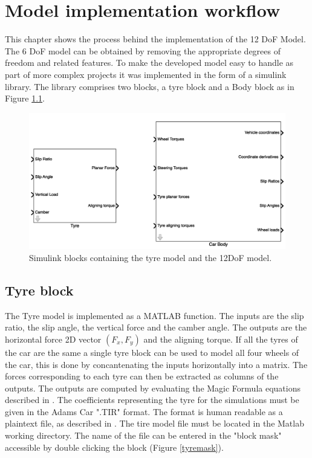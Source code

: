 \chapter{Model implementation workflow}
\label{chap:workflow}
This chapter shows the process behind the implementation of the 12 DoF Model. The 6 DoF model can be obtained by removing the appropriate degrees of freedom and related features.
To make the developed model easy to handle as part of more complex projects it was implemented in the form of a simulink library.
The library comprises two blocks, a tyre block and a Body block as in Figure \ref{blocks}.
\begin{figure}[ht]
    \centering
    \includegraphics[scale=0.5]{images/bodyblockmask.png}
    \caption{Simulink blocks containing the tyre model and the 12DoF model.}
    \label{blocks}
\end{figure}

\section{Tyre block}

The Tyre model is implemented as a MATLAB function. The inputs are the slip ratio, the slip angle, the vertical force and the camber angle. The outputs are the horizontal force 2D vector $(F_x, F_y)$ and the aligning torque.
If all the tyres of the car are the same a single tyre block can be used to model all four wheels of the car, this is done by concantenating the inputs horizontally into a matrix. The forces corresponding to each tyre can then be extracted as columns of the outputs.
The outputs are computed by evaluating the Magic Formula equations described in \cite{pac2002}.
The coefficients representing the tyre for the simulations must be given in the Adams Car ".TIR" format. The format is human readable as a plaintext file, as described in \cite{pac2002}.
The tire model file must be located in the Matlab working directory. The name of the file can be entered in the "block mask" accessible by double clicking the block (Figure \ref{tyremask}).

